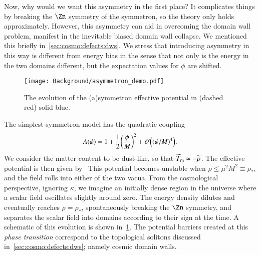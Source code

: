     Now, why would we want this asymmetry in the first place? It complicates things by breaking the $\Zn$ symmetry of the symmetron, so the theory only holds approximately. However, this asymmetry can aid in overcoming the domain wall problem, manifest in the inevitable biased domain wall collapse. We mentioned this briefly in~\cref{sec:cosmo:defects:dws}. %
    We stress that introducing asymmetry in this way is different from energy bias in the sense that not only is the energy in the two domains different, but the expectation values for $\phi$ are shifted.

    \begin{figure}[h]
        \centering
        {\texttt{[image: Background/asymmetron\_demo.pdf]}}
        \caption{The evolution of the (a)symmetron effective potential in (dashed red) solid blue.  
        }
        \label{fig:cosmo:quintessence:asymmetron_demo}
    \end{figure}

    The simplest symmetron model has the quadratic coupling
    \begin{equation}
        A(\phi)  = 1 +\frac{1}{2} {\left( \frac{\phi}{M} \right)}^2 + \mathscr{O}\Big( {(\phi/M)}^4 \Big).
    \end{equation}
    We consider the matter content to be dust-like, so that $\widetilde{T}_\mathrm{m}\simeq -\widetilde{\rho}$. The effective potential is then given by~\citep{hinterbichlerSymmetronCosmology2011}
    This potential becomes unstable when $\rho\leq \mu^2M^2\equiv \rho_\ast$, and the field rolls into either of the two vacua. From the cosmological perspective, ignoring $\kappa$, we imagine an initially dense region in the universe where a scalar field oscillates slightly around zero. The energy density dilutes and eventually reaches $\rho=\rho_\ast$, spontaneously breaking the $\Zn$ symmetry, and separates the scalar field into domains according to their sign at the time. A schematic of this evolution is shown in~\cref{fig:cosmo:quintessence:asymmetron_demo}. The potential barriers created at this \emph{phase transition} correspond to the topological solitons discussed in~\cref{sec:cosmo:defects:dws}; namely cosmic domain walls.

